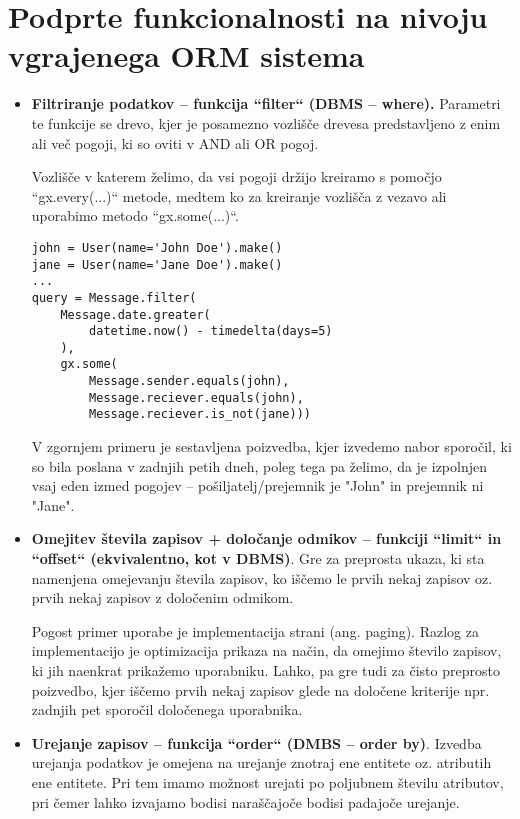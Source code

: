 \documentclass[a4paper,12pt,openright]{book}
\begin{document}
    \section{Podprte funkcionalnosti na nivoju vgrajenega ORM sistema}
    \begin{itemize}
        \item \textbf{Filtriranje podatkov – funkcija ``filter`` (DBMS – where).}
        \newline
        \noindent
        Parametri te funkcije se drevo, kjer je posamezno vozlišče drevesa predstavljeno z enim ali več pogoji, ki so oviti v AND ali OR pogoj.
        
        Vozlišče v katerem želimo, da vsi pogoji držijo kreiramo s pomočjo ``gx.every(...)`` metode, medtem ko za kreiranje vozlišča z vezavo ali uporabimo metodo ``gx.some(...)``.
        
\begin{verbatim}
john = User(name='John Doe').make()
jane = User(name='Jane Doe').make()
...
query = Message.filter(
    Message.date.greater(
        datetime.now() - timedelta(days=5)
    ),
    gx.some(
        Message.sender.equals(john),
        Message.reciever.equals(john),
        Message.reciever.is_not(jane)))
\end{verbatim}    

        \noindent
        V zgornjem primeru je sestavljena poizvedba, kjer izvedemo nabor sporočil, ki so bila poslana v zadnjih petih dneh, poleg tega pa želimo, da je izpolnjen vsaj eden izmed pogojev – pošiljatelj/prejemnik je "John" in prejemnik ni "Jane".
        
        \item \textbf{Omejitev števila zapisov + določanje odmikov – funkciji ``limit`` in ``offset`` (ekvivalentno, kot v DBMS)}. Gre za preprosta ukaza, ki sta namenjena omejevanju števila zapisov, ko iščemo le prvih nekaj zapisov oz. prvih nekaj zapisov z določenim odmikom. 

        Pogost primer uporabe je implementacija strani (ang. paging). Razlog za implementacijo je optimizacija prikaza na način, da omejimo število zapisov, ki jih naenkrat prikažemo uporabniku. Lahko, pa gre tudi za čisto preprosto poizvedbo, kjer iščemo prvih nekaj zapisov glede na določene kriterije npr. zadnjih pet sporočil določenega uporabnika.
        
        \item \textbf{Urejanje zapisov – funkcija ``order`` (DMBS – order by)}. 
        \noindent
        Izvedba urejanja podatkov je omejena na urejanje znotraj ene entitete oz. atributih ene entitete. Pri tem imamo možnost urejati po poljubnem številu atributov, pri čemer lahko izvajamo bodisi naraščajoče bodisi padajoče urejanje.


\end{itemize}
\end{document}
